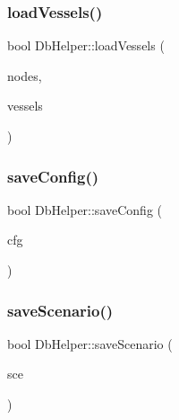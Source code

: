 \mbox{\label{class_db_helper_aaab0c72319c3007b41e56563bcc8539e}} 
\subsubsection{\texorpdfstring{loadVessels()}{loadVessels()}}
{\footnotesize\ttfamily bool Db\+Helper\+::load\+Vessels (\begin{DoxyParamCaption}\item[{const Q\+List$<$ std\+::shared\+\_\+ptr$<$ \mbox{\hyperlink{class_node_data}{Node\+Data}} $>$ $>$ \&}]{nodes,  }\item[{Q\+List$<$ std\+::shared\+\_\+ptr$<$ \mbox{\hyperlink{class_vessel_data}{Vessel\+Data}} $>$ $>$ \&}]{vessels }\end{DoxyParamCaption})}

\mbox{\label{class_db_helper_a3b86278040357ab06d5988ee8a424a59}} 
\subsubsection{\texorpdfstring{saveConfig()}{saveConfig()}}
{\footnotesize\ttfamily bool Db\+Helper\+::save\+Config (\begin{DoxyParamCaption}\item[{const \mbox{\hyperlink{class_config}{Config}} \&}]{cfg }\end{DoxyParamCaption})}

\mbox{\label{class_db_helper_ab77155de4a3599820b1c077f1b893098}} 
\subsubsection{\texorpdfstring{saveScenario()}{saveScenario()}}
{\footnotesize\ttfamily bool Db\+Helper\+::save\+Scenario (\begin{DoxyParamCaption}\item[{const \mbox{\hyperlink{class_scenario}{Scenario}} \&}]{sce }\end{DoxyParamCaption})}

\mbox{\label{class_db_helper_a9702ee4b770976d71c21d3ba1f5c888e}} 
